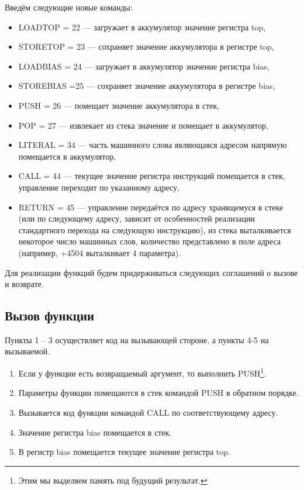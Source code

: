 \documentclass[12pt]{article}
\begin{document}
Введём следующие новые команды:
\begin{itemize}
 \item LOADTOP = 22 --- загружает в аккумулятор значение регистра top,
 \item STORETOP = 23 --- сохраняет значение аккумулятора в регистре top,
 \item LOADBIAS = 24 --- загружает в аккумулятор значение регистра bias,
 \item STOREBIAS =25 --- сохраняет значение аккумулятора в регистре bias,
 \item PUSH = 26 --- помещает значение аккумулятора в стек,
 \item POP = 27 --- извлекает из стека значение и помещает в аккумулятор,

 \item LITERAL = 34 --- часть машинного слова являющаяся адресом напрямую помещается в аккумулятор,

 \item CALL = 44 --- текущее значение регистра инструкций помещается в стек, управление переходит по указанному адресу,
 \item RETURN = 45 --- управление передаётся по адресу хранящемуся в стеке (или по следующему адресу, зависит от особенностей реализации стандартного перехода на следующую инструкцию), из стека выталкивается некоторое число машинных слов, количество представлено в поле адреса (например, +4504 выталкивает 4 параметра). 
\end{itemize}

Для реализации функций будем придерживаться следующих соглашений о вызове и возврате.
\subsection{Вызов функции}
Пункты 1 -- 3 осуществляет код на вызывающей стороне, а пункты 4-5 на вызываемой.
\begin{enumerate}
 \item Если у функции есть возвращаемый аргумент, то выполнить PUSH\footnote{Этим мы выделяем память под будущий результат.}.
 \item Параметры функции помещаются в стек командой PUSH в обратном порядке.
 \item Вызывается код функции командой CALL  по соответствующему адресу.
 \item Значение регистра bias помещается в стек. 
 \item В регистр bias помещается текущее значение регистра top.
\end{enumerate}
\end{document}
